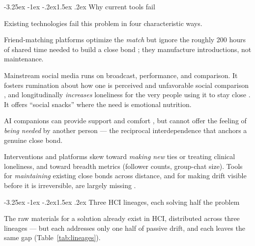 \documentclass[11pt]{article}
\makeatletter
\renewcommand\subsection{\@startsection{subsection}{2}{\z@}%
  {-3.25ex \@plus -1ex \@minus -.2ex}{1.5ex \@plus .2ex}%
  {\normalfont\large\bfseries\color{accent}}}
\makeatother
\begin{document}
\subsection{Why current tools fail}

Existing technologies fail this problem in four characteristic ways.

\begin{description}[leftmargin=1.2em, style=nextline]
\item[The ``new friends'' paradox.] Friend-matching platforms optimize the
\emph{match} but ignore the roughly 200 hours of shared time needed to build a
close bond \citep{hall2019}; they manufacture introductions, not maintenance.
\item[Social snacks, not nutrition.] Mainstream social media runs on broadcast,
performance, and comparison. It fosters rumination about how one is perceived and
unfavorable social comparison \citep{stritzke2004}, and longitudinally
\emph{increases} loneliness for the very people using it to stay close
\citep{robertsyoungdavid2025}. It offers ``social snacks'' where the need is
emotional nutrition.
\item[Comfort without being needed.] AI companions can provide support and
comfort \citep{ta2020}, but cannot offer the feeling of \emph{being needed} by
another person --- the reciprocal interdependence that anchors a genuine close
bond.
\item[Breadth over depth.] Interventions and platforms skew toward
\emph{making new} ties or treating clinical loneliness, and toward breadth
metrics (follower counts, group-chat size). Tools for \emph{maintaining} existing
close bonds across distance, and for making drift visible before it is
irreversible, are largely missing \citep{akhterkhan2020, hansen2025}.
\end{description}

\subsection{Three HCI lineages, each solving half the problem}

The raw materials for a solution already exist in HCI, distributed across three
lineages --- but each addresses only one half of passive drift, and each leaves
the same gap (Table~\ref{tab:lineages}).
\end{document}
